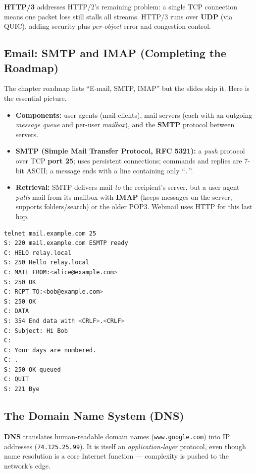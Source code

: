 \documentclass[hidelinks]{article}
\begin{document}
\textbf{HTTP/3} addresses HTTP/2's remaining problem: a single TCP connection
means one packet loss still stalls all streams. HTTP/3 runs over
\textbf{UDP} (via QUIC), adding security plus \emph{per-object} error and
congestion control.

\subsection{Email: SMTP and IMAP (Completing the Roadmap)}

The chapter roadmap lists ``E-mail, SMTP, IMAP'' but the slides skip it.
Here is the essential picture.

\begin{itemize}
    \item \textbf{Components:} user agents (mail clients), mail servers
    (each with an outgoing \emph{message queue} and per-user \emph{mailbox}),
    and the \textbf{SMTP} protocol between servers.
    \item \textbf{SMTP (Simple Mail Transfer Protocol, RFC 5321):} a
    \emph{push} protocol over TCP \textbf{port 25}; uses persistent
    connections; commands and replies are 7-bit ASCII; a message ends with a
    line containing only ``\texttt{.}''.
    \item \textbf{Retrieval:} SMTP delivers mail \emph{to} the recipient's
    server, but a user agent \emph{pulls} mail from its mailbox with
    \textbf{IMAP} (keeps messages on the server, supports folders/search) or
    the older POP3. Webmail uses HTTP for this last hop.
\end{itemize}

\begin{lstlisting}[language=bash, caption={A bare SMTP dialog (client lines after the prompts)}]
telnet mail.example.com 25
S: 220 mail.example.com ESMTP ready
C: HELO relay.local
S: 250 Hello relay.local
C: MAIL FROM:<alice@example.com>
S: 250 OK
C: RCPT TO:<bob@example.com>
S: 250 OK
C: DATA
S: 354 End data with <CRLF>.<CRLF>
C: Subject: Hi Bob
C:
C: Your days are numbered.
C: .
S: 250 OK queued
C: QUIT
S: 221 Bye
\end{lstlisting}

\subsection{The Domain Name System (DNS)}

\textbf{DNS} translates human-readable domain names (\texttt{www.google.com})
into IP addresses (\texttt{74.125.25.99}). It is itself an
\emph{application-layer} protocol, even though name resolution is a core
Internet function --- complexity is pushed to the network's edge.
\end{document}
